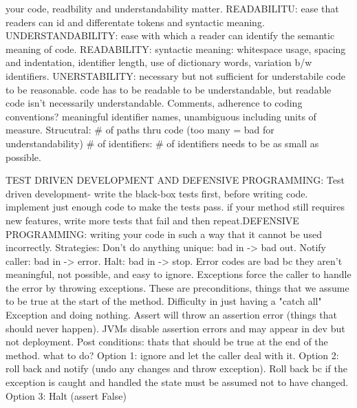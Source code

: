 \documentclass[10pt]{article}
\begin{document}
\begin{landscape}
\begin{multicols*}{6}
your code, readbility and understandability matter. READABILITU: ease that readers can id and differentate tokens and syntactic meaning. UNDERSTANDABILITY: ease with which a reader can identify the semantic meaning of code. READABILITY: syntactic meaning: whitespace usage, spacing and indentation, identifier length, use of dictionary words, variation b/w identifiers. UNERSTABILITY: necessary but not sufficient for understabile code to be reasonable. code has to be readable to be understandable, but readable code isn't necessarily understandable. Comments, adherence to coding conventions? meaningful identifier names, unambiguous including units of measure. Strucutral: \# of paths thru code (too many = bad for understandability) \# of identifiers: \# of identifiers needs to be as small as possible. 

TEST DRIVEN DEVELOPMENT AND DEFENSIVE PROGRAMMING: Test driven development- write the black-box tests first, before writing code. implement just enough code to make the tests pass. if your method still requires new features, write more tests that fail and then repeat.DEFENSIVE PROGRAMMING: writing your code in such a way that it cannot be used incorrectly. Strategies: Don't do anything unique: bad in -> bad out. Notify caller: bad in -> error. Halt: bad in -> stop. Error codes are bad bc they aren't meaningful, not possible, and easy to ignore. Exceptions force the caller to handle the error by throwing exceptions. These are preconditions, things that we assume to be true at the start of the method. Difficulty in just having a "catch all" Exception and doing nothing. Assert will throw an assertion error (things that should never happen). JVMs disable assertion errors and may appear in dev but not deployment. Post conditions: thats that should be true at the end of the method. what to do? Option 1: ignore and let the caller deal with it. Option 2: roll back and notify (undo any changes and throw exception). Roll back bc if the exception is caught and handled the state must be assumed not to have changed. Option 3: Halt (assert False)

\end{multicols*}
\end{landscape}
\end{document}
